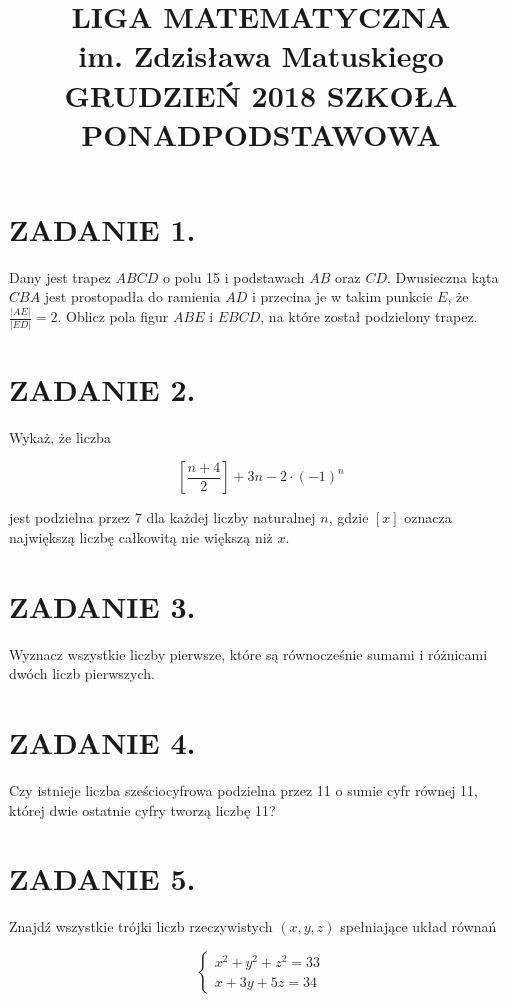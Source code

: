 \documentclass[10pt]{article}
\title{LIGA MATEMATYCZNA \\
 im. Zdzisława Matuskiego GRUDZIEŃ 2018 SZKOŁA PONADPODSTAWOWA }
\author{}
\date{}
\begin{document}
\maketitle
\section*{ZADANIE 1.}
Dany jest trapez \(A B C D\) o polu 15 i podstawach \(A B\) oraz \(C D\). Dwusieczna kąta \(C B A\) jest prostopadła do ramienia \(A D\) i przecina je w takim punkcie \(E\), że \(\frac{|A E|}{|E D|}=2\). Oblicz pola figur \(A B E\) i \(E B C D\), na które został podzielony trapez.

\section*{ZADANIE 2.}
Wykaż, że liczba

\[
\left[\frac{n+4}{2}\right]+3 n-2 \cdot(-1)^{n}
\]

jest podzielna przez 7 dla każdej liczby naturalnej \(n\), gdzie \([x]\) oznacza największą liczbę całkowitą nie większą niż \(x\).

\section*{ZADANIE 3.}
Wyznacz wszystkie liczby pierwsze, które są równocześnie sumami i różnicami dwóch liczb pierwszych.

\section*{ZADANIE 4.}
Czy istnieje liczba sześciocyfrowa podzielna przez 11 o sumie cyfr równej 11, której dwie ostatnie cyfry tworzą liczbę 11?

\section*{ZADANIE 5.}
Znajdź wszystkie trójki liczb rzeczywistych \((x, y, z)\) spełniające układ równań

\[
\left\{\begin{array}{l}
x^{2}+y^{2}+z^{2}=33 \\
x+3 y+5 z=34
\end{array}\right.
\]
\end{document}
